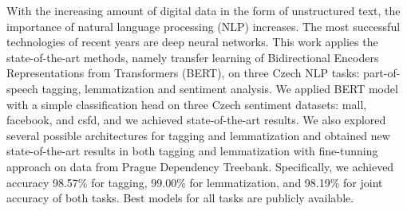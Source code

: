 \documentclass[]{article}
\begin{document}
With the increasing amount of digital data in the form of unstructured text, the importance of natural language processing (NLP) increases. The most successful technologies of recent years are deep neural networks. This work applies the state-of-the-art methods, namely transfer learning of Bidirectional Encoders Representations from Transformers (BERT), on three Czech NLP tasks: part-of-speech tagging, lemmatization and sentiment analysis. We applied BERT model with a simple classification head on three Czech sentiment datasets: mall, facebook, and csfd, and we achieved state-of-the-art results. We also explored several possible architectures for tagging and lemmatization and obtained new state-of-the-art results in both tagging and lemmatization with fine-tunning approach on data from Prague Dependency Treebank. Specifically, we achieved accuracy 98.57\% for tagging, 99.00\% for lemmatization, and 98.19\%  for joint accuracy of both tasks. Best models for all tasks are publicly available.
\end{document}
